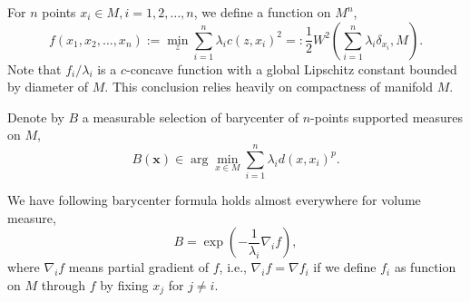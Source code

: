 For $n$ points $x_i \in M, i=1,2,\ldots,n$, we define a function on $M^n$,
\[
	f(x_1, x_2, \ldots, x_n) := \min_{z} \sum_{i=1}^n \lambda_i c(z, x_i)^2 =: \frac{1}{2}W^2(\sum_{i=1}^n \lambda_i \delta_{x_i}, M).
\]
Note that $f_i / \lambda_i $ is a $c$-concave function with a global Lipschitz constant bounded by diameter of $M$.
This conclusion relies heavily on compactness of manifold $M$.

Denote by $B$ a measurable selection of barycenter of $n$-points supported measures on $M$,
\[
	B(\boldsymbol{x}) \in \arg \min_{x \in M} \sum_{i=1}^{n} \lambda_i d(x, x_i)^p.
\]


We have following barycenter formula holds almost everywhere for volume measure,
\begin{equation}
	\label{formula_barycenter}
	B = \exp (- \frac{1}{\lambda_i} \nabla_i f),
\end{equation}
where $\nabla_i f$ means partial gradient of $f$,
i.e., $\nabla_i f = \nabla f_i$ if we define $f_i$ as function on $M$ through $f$ by fixing $x_j$ for $j \neq i$.


